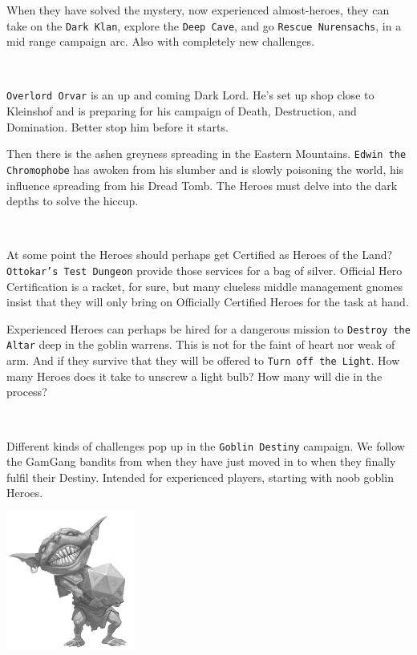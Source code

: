 When they have solved the mystery, now experienced almost-heroes, they can take on the \texttt{Dark Klan}, explore the \texttt{Deep Cave}, and go \texttt{Rescue Nurensachs}, in a mid range campaign arc. Also with completely new challenges.

\

\noindent
\texttt{Overlord Orvar} is an up and coming Dark Lord. He's set up shop close to Kleinshof and is preparing for his campaign of Death, Destruction, and Domination. Better stop him before it starts.

Then there is the ashen greyness spreading in the Eastern Mountains. \texttt{Edwin the Chromophobe} has awoken from his slumber and is slowly poisoning the world, his influence spreading from his Dread Tomb. The Heroes must delve into the dark depths to solve the hiccup.

\

\noindent
At some point the Heroes should perhaps get Certified as Heroes of the Land? \texttt{Ottokar's Test Dungeon} provide those services for a bag of silver. Official Hero Certification is a racket, for sure, but many clueless middle management gnomes insist that they will only bring on Officially Certified Heroes for the task at hand.

Experienced Heroes can perhaps be hired for a dangerous mission to \texttt{Destroy the Altar} deep in the goblin warrens. This is not for the faint of heart nor weak of arm. And if they survive that they will be offered to \texttt{Turn off the Light}. How many Heroes does it take to unscrew a light bulb? How many will die in the process?

\

\noindent
Different kinds of challenges pop up in the \texttt{Goblin Destiny} campaign. We follow the GamGang bandits from when they have just moved in to when they finally fulfil their Destiny. Intended for experienced players, starting with noob goblin Heroes.


\vfill

\begin{center}
\includegraphics[height=45mm]{./fig/dicegoblin.jpg}
\end{center}







